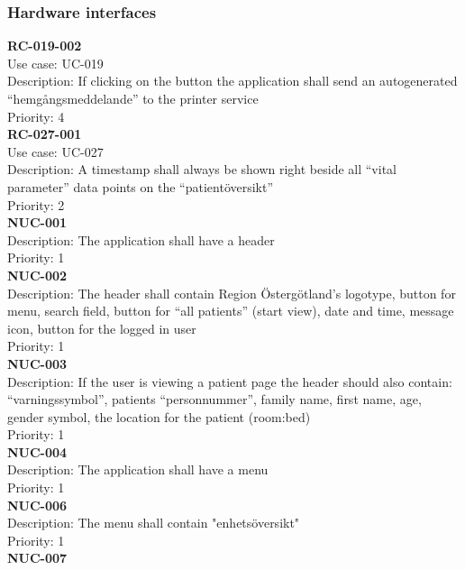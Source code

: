 \subsubsection{Hardware interfaces}
\textbf{RC-019-002} \\
Use case: UC-019 \\
Description: If clicking on the button the application shall send an autogenerated “hemgångsmeddelande” to the printer service  \\
Priority: 4 \\
\newline
\textbf{RC-027-001} \\
Use case: UC-027 \\
Description: A timestamp shall always be shown right beside all “vital parameter” data points on the “patientöversikt” \\
Priority: 2 \\
\newline
\textbf{NUC-001} \\
Description: The application shall have a header \\
Priority: 1 \\
\newline
\textbf{NUC-002} \\
Description: The header shall contain Region Östergötland's logotype, button for menu, search field, button for “all patients” (start view), date and time, message icon, button for the logged in user\\
Priority: 1 \\
\newline
\textbf{NUC-003} \\
Description: If the user is viewing a patient page the header should also contain: “varningssymbol”, patients “personnummer”, family name, first name, age, gender symbol, the location for the patient (room:bed)\\
Priority: 1 \\
\newline
\textbf{NUC-004} \\
Description: The application shall have a menu \\
Priority: 1 \\
\newline
\textbf{NUC-006} \\
Description: The menu shall contain "enhetsöversikt"\\
Priority: 1 \\
\newline
\textbf{NUC-007} \\

